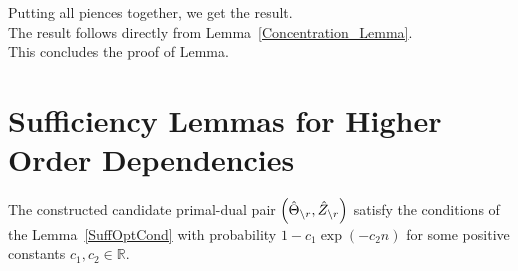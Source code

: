 \noindent Putting all piences together, we get the result.\\

 The result follows directly from Lemma~\ref{Concentration_Lemma}.\\

This concludes the proof of Lemma.


\section{Sufficiency Lemmas for Higher Order Dependencies}
\begin{lemma}
The constructed candidate primal-dual pair $\left(\hat{\Theta}_{\backslash r},\hat{Z}_{\backslash r}\right)$ satisfy the conditions of the Lemma~\ref{SuffOptCond} with probability $1-c_1\exp(-c_2n)$ for some positive constants $c_1,c_2\in\mathbb{R}$.
\label{OptCertificate_general}
\end{lemma}

